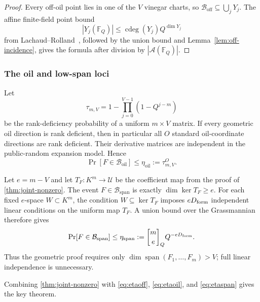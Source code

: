\documentclass[11pt,a4paper]{article}
\theoremstyle{definition}
\theoremstyle{remark}
\newcommand{\F}{\mathbb F}
\newcommand{\cB}{\mathcal B}
\newcommand{\cU}{\mathcal U}
\newcommand{\Span}{\operatorname{span}}
\newcommand{\cdeg}{\operatorname{cdeg}}
\newcommand{\oil}{\mathrm{oil}}
\newcommand{\off}{\mathrm{off}}
\newcommand{\spanbad}{\mathrm{span}}
\begin{document}
\begin{proof}
Every off-oil point lies in one of the $V$ vinegar charts, so $\cB_{\off}\subseteq\bigcup_jY_j$.  The affine finite-field point bound
\[
|Y_j(\F_Q)|\le\cdeg(Y_j)Q^{\dim Y_j}
\]
from Lachaud--Rolland~\cite{LachaudRolland}, followed by the union bound and Lemma~\ref{lem:off-incidence}, gives the formula after division by $|\mathcal A(\F_Q)|$.
\end{proof}

\subsubsection{The oil and low-span loci}

Let
\[
\tau_{m,V}=1-\prod_{j=0}^{V-1}(1-Q^{j-m})
\]
be the rank-deficiency probability of a uniform $m\times V$ matrix.  If every geometric oil direction is rank deficient, then in particular all $O$ standard oil-coordinate directions are rank deficient.  Their derivative matrices are independent in the public-random expansion model.  Hence
\begin{equation}\label{eq:etaoil}
\Pr[F\in\cB_{\oil}]\le\eta_{\oil}:=\tau_{m,V}^{O}.
\end{equation}

Let $e=m-V$ and let $T_F:K^m\to\cU$ be the coefficient map from the proof of \cref{thm:joint-nonzero}.  The event $F\in\cB_{\spanbad}$ is exactly $\dim\ker T_F\ge e$.  For each fixed $e$-space $W\subset K^m$, the condition $W\subseteq\ker T_F$ imposes $eD_{\rm form}$ independent linear conditions on the uniform map $T_F$.  A union bound over the Grassmannian therefore gives
\begin{equation}\label{eq:etaspan}
\Pr[F\in\cB_{\spanbad}]
\le
\eta_{\rm span}:=
\genfrac{[}{]}{0pt}{}{m}{e}_Q Q^{-eD_{\rm form}}.
\end{equation}
Thus the geometric proof requires only $\dim\Span(F_1,\ldots,F_m)>V$; full linear independence is unnecessary.

Combining \cref{thm:joint-nonzero} with
\eqref{eq:etaoff}, \eqref{eq:etaoil}, and \eqref{eq:etaspan} gives the key theorem.
\end{document}

